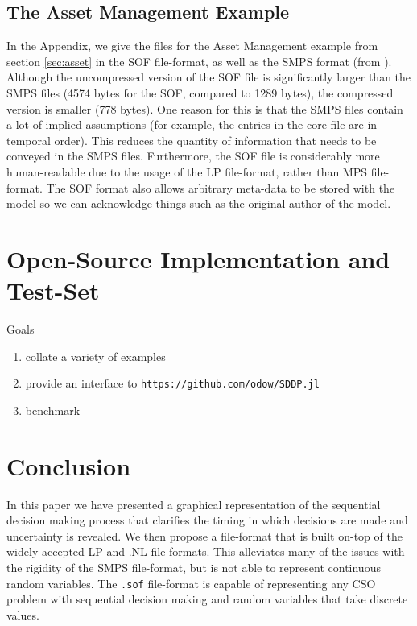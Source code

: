 \documentclass[final,1p,times]{elsarticle}
\begin{document}

\subsection{The Asset Management Example}

In the Appendix, we give the files for the Asset Management example from section \ref{sec:asset} in the SOF file-format, as well as the SMPS format (from \cite{smps}). Although the uncompressed version of the SOF file is significantly larger than the SMPS files (4574 bytes for the SOF, compared to 1289 bytes), the compressed version is smaller (778 bytes). One reason for this is that the SMPS files contain a lot of implied assumptions (for example, the entries in the core file are in temporal order). This reduces the quantity of information that needs to be conveyed in the SMPS files. Furthermore, the SOF file is considerably more human-readable due to the usage of the LP file-format, rather than MPS file-format. The SOF format also allows arbitrary meta-data to be stored with the model so we can acknowledge things such as the original author of the model.


    
    

\section{Open-Source Implementation and Test-Set}

Goals
\begin{enumerate}
    \item collate a variety of examples
    \item provide an interface to \texttt{https://github.com/odow/SDDP.jl}
    \item benchmark
\end{enumerate}

\section{Conclusion}

In this paper we have presented a graphical representation of the sequential decision making process that clarifies the timing in which decisions are made and uncertainty is revealed. We then propose a file-format that is built on-top of the widely accepted LP and .NL file-formats. This alleviates many of the issues with the rigidity of the SMPS file-format, but is not able to represent continuous random variables. The \texttt{.sof} file-format is capable of representing any CSO problem with sequential decision making and random variables that take discrete values. 
\end{document}
